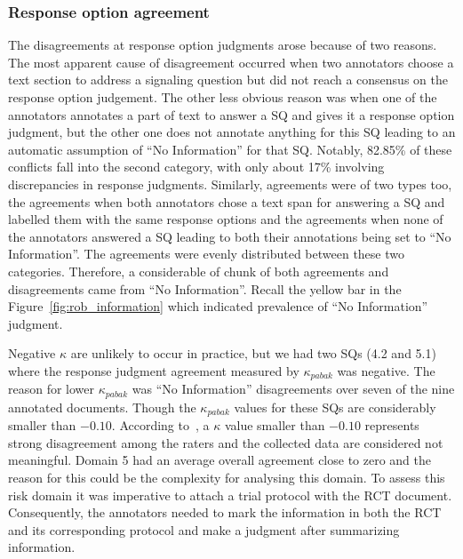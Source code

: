 \documentclass[sn-mathphys,Numbered]{sn-jnl}%
\theoremstyle{thmstyleone}%
\theoremstyle{thmstyletwo}%
\theoremstyle{thmstylethree}%
\begin{document}
\subsubsection{Response option agreement}
\label{disc:kappa}
%
The disagreements at response option judgments arose because of two reasons.
The most apparent cause of disagreement occurred when two annotators choose a text section to address a signaling question but did not reach a consensus on the response option judgement.
The other less obvious reason was when one of the annotators annotates a part of text to answer a SQ and gives it a response option judgment, but the other one does not annotate anything for this SQ leading to an automatic assumption of ``No Information'' for that SQ.
Notably, 82.85\% of these conflicts fall into the second category, with only about 17\% involving discrepancies in response judgments.
Similarly, agreements were of two types too, the agreements when both annotators chose a text span for answering a SQ and labelled them with the same response options and the agreements when none of the annotators answered a SQ leading to both their annotations being set to ``No Information''.
The agreements were evenly distributed between these two categories.
Therefore, a considerable of chunk of both agreements and disagreements came from ``No Information''.
Recall the yellow bar in the Figure~\ref{fig:rob_information} which indicated prevalence of ``No Information'' judgment.


Negative $\kappa$ are unlikely to occur in practice, but we had two SQs (4.2 and 5.1) where the response judgment agreement measured by $\kappa_{pabak}$ was negative.
The reason for lower $\kappa_{pabak}$ was ``No Information'' disagreements over seven of the nine annotated documents. 
Though the $\kappa_{pabak}$ values for these SQs are considerably smaller than $-0.10$.
According to~\cite{mchugh2012interrater}, a $\kappa$ value smaller than $-0.10$ represents strong disagreement among the raters and the collected data are considered not meaningful.
Domain 5 had an average overall agreement close to zero and the reason for this could be the complexity for analysing this domain.
To assess this risk domain it was imperative to attach a trial protocol with the RCT document.
Consequently, the annotators needed to mark the information in both the RCT and its corresponding protocol and make a judgment after summarizing information.
\end{document}
